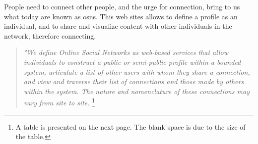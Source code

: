 
People need to connect other people, and the urge for connection, bring to us what today are known as \glspl{osn}.
This web sites allows to define a profile as an individual, and to share and visualize content with other individuals in the network, therefore connecting.

\begin{quote}
\textit{"We define Online Social Networks as web-based services that allow individuals to construct a public or semi-public
 profile within a bounded system, articulate a list of other users with whom they share a connection, and view and traverse
 their list of connections and those made by others within the system. The nature and nomenclature of these connections
 may vary from site to site.} \cite{ellison2007social} \footnote{A table is presented on the next page. The blank space is due to the size of the table.}
\end{quote}

